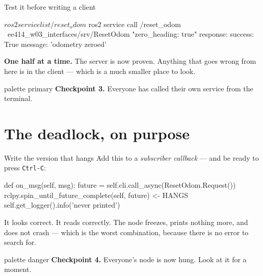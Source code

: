 \documentclass[aspectratio=169]{beamer}
\begin{document}
\begin{frame}[fragile]{Test it before writing a client}
  \begin{shells}
$ ros2 service list
/reset_odom
$ ros2 service call /reset_odom \
      ee414_w03_interfaces/srv/ResetOdom "{zero_heading: true}"
response:
  success: True
  message: 'odometry zeroed'
  \end{shells}

  \vspace{0.4em}
  \small
  \textbf{One half at a time.} The server is now proven. Anything that goes wrong from here is
  in the client --- which is a much smaller place to look.

  \vspace{0.2em}
  \centering
  \begin{beamercolorbox}[sep=5pt,center,rounded=true]{palette primary}
    \footnotesize \textbf{Checkpoint 3.} Everyone has called their own service from the terminal.
  \end{beamercolorbox}
\end{frame}

\section{The deadlock, on purpose}

\begin{frame}[fragile]{Write the version that hangs}
  \small Add this to a \emph{subscriber callback} --- and be ready to press \texttt{Ctrl-C}:

  \begin{pycodes}
def on_msg(self, msg):
    future = self.cli.call_async(ResetOdom.Request())
    rclpy.spin_until_future_complete(self, future)    <- HANGS
    self.get_logger().info('never printed')
  \end{pycodes}

  \vspace{0.4em}
  \small
  It looks correct. It reads correctly. The node freezes, prints nothing more, and does not
  crash --- which is the worst combination, because there is no error to search for.

  \vspace{0.3em}
  \centering
  \begin{beamercolorbox}[sep=5pt,center,rounded=true]{palette danger}
    \footnotesize \textbf{Checkpoint 4.} Everyone's node is now hung. Look at it for a moment.
  \end{beamercolorbox}
\end{frame}
\end{document}

